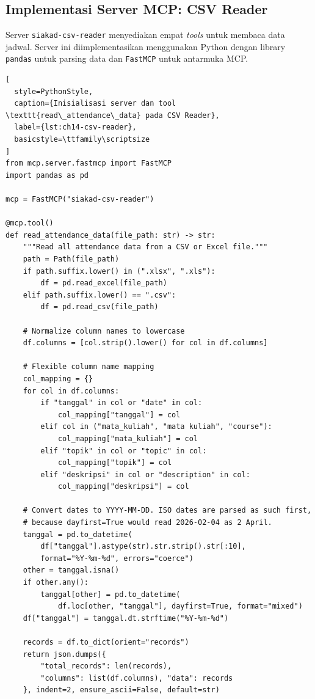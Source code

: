 \subsection{Implementasi Server MCP: CSV Reader}

Server \texttt{siakad-csv-reader} menyediakan empat \textit{tools} untuk membaca data jadwal. Server ini diimplementasikan menggunakan Python dengan library \texttt{pandas} untuk parsing data dan \texttt{FastMCP} untuk antarmuka MCP.

\begin{lstlisting}[
  style=PythonStyle,
  caption={Inisialisasi server dan tool \texttt{read\_attendance\_data} pada CSV Reader},
  label={lst:ch14-csv-reader},
  basicstyle=\ttfamily\scriptsize
]
from mcp.server.fastmcp import FastMCP
import pandas as pd

mcp = FastMCP("siakad-csv-reader")

@mcp.tool()
def read_attendance_data(file_path: str) -> str:
    """Read all attendance data from a CSV or Excel file."""
    path = Path(file_path)
    if path.suffix.lower() in (".xlsx", ".xls"):
        df = pd.read_excel(file_path)
    elif path.suffix.lower() == ".csv":
        df = pd.read_csv(file_path)

    # Normalize column names to lowercase
    df.columns = [col.strip().lower() for col in df.columns]

    # Flexible column name mapping
    col_mapping = {}
    for col in df.columns:
        if "tanggal" in col or "date" in col:
            col_mapping["tanggal"] = col
        elif col in ("mata_kuliah", "mata kuliah", "course"):
            col_mapping["mata_kuliah"] = col
        elif "topik" in col or "topic" in col:
            col_mapping["topik"] = col
        elif "deskripsi" in col or "description" in col:
            col_mapping["deskripsi"] = col

    # Convert dates to YYYY-MM-DD. ISO dates are parsed as such first,
    # because dayfirst=True would read 2026-02-04 as 2 April.
    tanggal = pd.to_datetime(
        df["tanggal"].astype(str).str.strip().str[:10],
        format="%Y-%m-%d", errors="coerce")
    other = tanggal.isna()
    if other.any():
        tanggal[other] = pd.to_datetime(
            df.loc[other, "tanggal"], dayfirst=True, format="mixed")
    df["tanggal"] = tanggal.dt.strftime("%Y-%m-%d")

    records = df.to_dict(orient="records")
    return json.dumps({
        "total_records": len(records),
        "columns": list(df.columns), "data": records
    }, indent=2, ensure_ascii=False, default=str)
\end{lstlisting}

